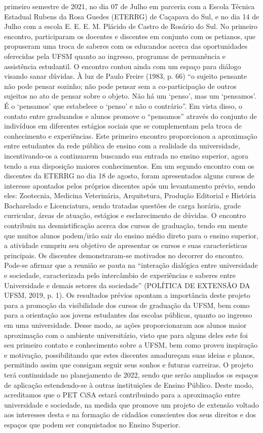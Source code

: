 primeiro semestre de 2021, no dia 07 de Julho em parceria com a Escola Técnica Estadual Rubens 
da Rosa Guedes (ETERRG) de Caçapava do Sul, e no dia 14 de Julho com a escola E. E. E. M. 
Plácido de Castro de Rosário do Sul.
No primeiro encontro, participaram os docentes e discentes em conjunto com os petianos, que 
propuseram uma troca de saberes com os educandos acerca das oportunidades oferecidas pela 
UFSM quanto ao ingresso, programas de permanência e assistência estudantil. O encontro contou 
ainda com um espaço para diálogo visando sanar dúvidas. À luz de Paulo Freire (1983, p. 66) “o 
sujeito pensante não pode pensar sozinho; não pode pensar sem a co-participação de outros sujeitos 
no ato de pensar sobre o objeto. Não há um ‘penso’, mas um ‘pensamos’. É o ‘pensamos’ que 
estabelece o ‘penso’ e não o contrário”. Em vista disso, o contato entre graduandos e alunos 
promove o “pensamos” através do conjunto de indivíduos em diferentes estágios sociais que se 
complementam pela troca de conhecimento e experiências. Este primeiro encontro proporcionou 
a aproximação entre estudantes da rede pública de ensino com a realidade da universidade, 
incentivando-os a continuarem buscando sua entrada no ensino superior, agora tendo a sua 
disposição maiores conhecimentos.
Em um segundo encontro com os discentes da ETERRG no dia 18 de agosto, foram apresentados 
alguns cursos de interesse apontados pelos próprios discentes após um levantamento prévio, sendo 
eles: Zootecnia, Medicina Veterinária, Arquitetura, Produção Editorial e História Bacharelado e 
Licenciatura, sendo tratadas questões de carga horária, grade curricular, áreas de atuação, estágios 
e esclarecimento de dúvidas. O encontro contribuiu na desmistificação acerca dos cursos de 
graduação, tendo em mente que muitos alunos podem/irão sair do ensino médio direto para o 
ensino superior, a atividade cumpriu seu objetivo de apresentar os cursos e suas características 
principais. Os discentes demonstraram-se motivados no decorrer do encontro. Pode-se afirmar que 
a reunião se pauta na “interação dialógica entre universidade e sociedade, caracterizada pelo 
intercâmbio de experiências e saberes entre Universidade e demais setores da sociedade” 
(POLÍTICA DE EXTENSÃO DA UFSM, 2019, p. 1).
Os resultados prévios apontam a importância deste projeto para a promoção da visibilidade dos 
cursos de graduação da UFSM, bem como para a orientação aos jovens estudantes das escolas 
públicas, quanto ao ingresso em uma universidade. Desse modo, as ações proporcionaram aos 
alunos maior aproximação com o ambiente universitário, visto que para alguns deles este foi seu 
primeiro contato e conhecimento sobre a UFSM, bem como proveu inspiração e motivação, 
possibilitando que estes discentes amadureçam suas ideias e planos, permitindo assim que 
consigam seguir seus sonhos e futuras carreiras. O projeto terá continuidade no planejamento de 
2022, sendo que serão ampliados os espaços de aplicação estendendo-se à outras instituições de 
Ensino Público. Deste modo, acreditamos que o PET CiSA estará contribuindo para a aproximação 
entre universidade e sociedade, na medida que promove um projeto de extensão voltado aos 
interesses desta e na formação de cidadãos conscientes dos seus direitos e dos espaços que podem 
ser conquistados no Ensino Superior.

